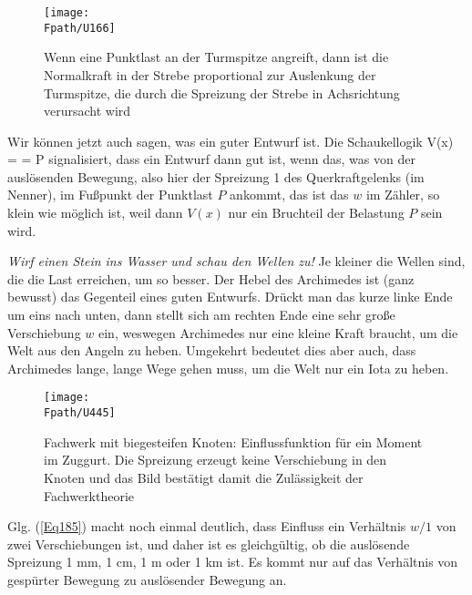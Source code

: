 \begin{figure}[tbp]
\centering
\if {} \sidecaption \fi
\texttt{[image: \\Fpath/U166]}
\caption{Wenn eine Punktlast an der Turmspitze angreift, dann ist die Normalkraft in der Strebe proportional zur Auslenkung der Turmspitze, die durch die Spreizung der Strebe in Achsrichtung verursacht wird} \label{U166}
\end{figure}%
Wir k\"{o}nnen jetzt auch sagen, was ein guter Entwurf ist. Die Schaukellogik
\beq\label{Eq185}
V(x) =  = P \cdot {} \qquad \leftarrow \qquad{}
\eeq
signalisiert, dass ein Entwurf dann gut ist, wenn das, was von der ausl\"{o}senden Bewegung, also hier der Spreizung 1 des Querkraftgelenks (im Nenner), im Fu{\ss}punkt der Punktlast $P$ ankommt, das ist das $w$ im Z\"{a}hler, so klein wie m\"{o}glich ist, weil dann $V(x)$ nur ein Bruchteil der Belastung $P$ sein wird.

{\em Wirf einen Stein ins Wasser und schau den Wellen zu!\/} Je kleiner die Wellen sind, die die Last erreichen, um so besser.
Der Hebel des Archimedes ist (ganz bewusst) das Gegenteil eines guten Entwurfs. Dr\"{u}ckt man das kurze linke Ende um eins nach unten, dann stellt sich am rechten Ende eine sehr gro{\ss}e Verschiebung $w$ ein, weswegen Archimedes nur eine kleine Kraft braucht, um die Welt aus den Angeln zu heben. Umgekehrt bedeutet dies aber auch, dass Archimedes lange, lange Wege gehen muss, um die Welt nur ein Iota zu heben.\\

\begin{figure}[tbp]
\centering
\if {} \sidecaption \fi
\texttt{[image: \\Fpath/U445]}
\caption{Fachwerk mit biegesteifen Knoten: Einflussfunktion f\"{u}r ein Moment im Zuggurt. Die Spreizung erzeugt keine Verschiebung in den Knoten und das Bild best\"{a}tigt damit die Zul\"{a}ssigkeit der Fachwerktheorie} \label{U445}
\end{figure}\label{Korrektur38}
\begin{remark}
Glg. (\ref{Eq185}) macht noch einmal deutlich, dass Einfluss ein Verh\"{a}ltnis $w/1$ von zwei Verschiebungen ist, und daher ist es gleichg\"{u}ltig, ob die ausl\"{o}sende Spreizung 1 mm, 1 cm, 1 m oder 1 km ist. Es kommt nur auf das Verh\"{a}ltnis von gesp\"{u}rter Bewegung zu ausl\"{o}sender Bewegung an.
\end{remark}

